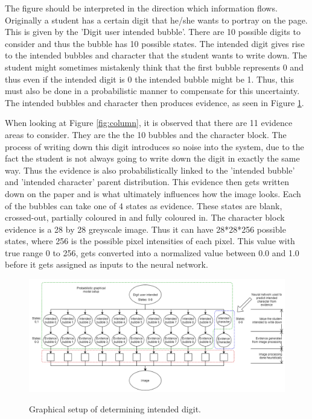 The figure should be interpreted in the direction which information flows. Originally a student has a certain digit that he/she wants to portray on the page. This is given by the 'Digit user intended bubble'. There are 10 possible digits to consider and thus the bubble has 10 possible states. The intended digit gives rise to the intended bubbles and character that the student wants to write down. The student might sometimes mistakenly think that the first bubble represents 0 and thus even if the intended digit is 0 the intended bubble might be 1. Thus, this must also be done in a probabilistic manner to compensate for this uncertainty. The intended bubbles and character then produces evidence, as seen in Figure \ref{fig:pgmDigit}.  

When looking at Figure \ref{fig:column}, it is observed that there are 11 evidence areas to consider. They are the the 10 bubbles and the character block. The process of writing down this digit introduces so noise into the system, due to the fact the student is not always going to write down the digit in exactly the same way. Thus the evidence is also probabilistically linked to the 'intended bubble' and 'intended character' parent distribution. This evidence then gets written down on the paper and is what ultimately influences how the image looks. Each of the bubbles can take one of 4 states as evidence. These states are blank, crossed-out, partially coloured in and fully coloured in. The character block evidence is a 28 by 28 greyscale image. Thus it can have 28*28*256 possible states, where 256 is the possible pixel intensities of each pixel. This value with true range 0 to 256, gets converted into a normalized value between 0.0 and 1.0 before it gets assigned as inputs to the neural network.

\begin{figure}
  \centering
  \includegraphics[width=16cm]{pgmDigit}\\
  \caption{Graphical setup of determining intended digit.}
  \label{fig:pgmDigit}
\end{figure}


